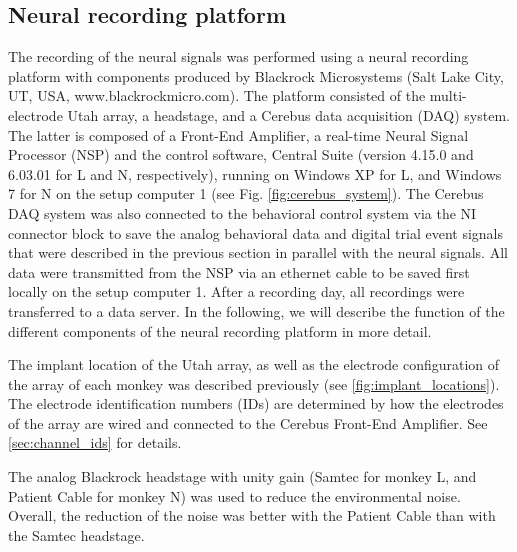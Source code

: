 {\subsection{Neural recording platform}
\label{sec:neural_recording_platform}
The recording of the neural signals was performed using a neural recording platform with components produced by Blackrock Microsystems (Salt Lake City, UT, USA, www.blackrockmicro.com). The platform consisted of the multi-electrode Utah array, a headstage, and a Cerebus data acquisition (DAQ) system. The latter is composed of a Front-End Amplifier, a real-time Neural Signal Processor (NSP) and the control software, Central Suite (version 4.15.0 and 6.03.01 for L and N, respectively), running on Windows XP for L, and Windows 7 for N on the setup computer 1 (see Fig. \cref{fig:cerebus_system}). The Cerebus DAQ system was also connected to the behavioral control system via the NI connector block to save the analog behavioral data and digital trial event signals that were described in the previous section in parallel with the neural signals. All data were transmitted from the NSP via an ethernet cable to be saved first locally on the setup computer 1. After a recording day, all recordings were transferred to a data server. In the following, we will describe the function of the different components of the neural recording platform in more detail.

The implant location of the Utah array, as well as the electrode configuration of the array of each monkey was described previously (see \cref{fig:implant_locations}). The electrode identification numbers (IDs) are determined by how the electrodes of the array are wired and connected to the Cerebus Front-End Amplifier. See \cref{sec:channel_ids} for details.

The analog Blackrock headstage with unity gain (Samtec for monkey L, and Patient Cable for monkey N) was used to reduce the environmental noise. Overall, the reduction of the noise was better with the Patient Cable than with the Samtec headstage.

}
